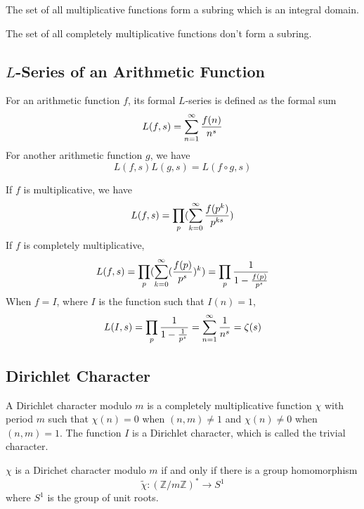 The set of all multiplicative functions form a subring which is an integral domain.

The set of all completely multiplicative functions don't form a subring.

\subsection{$L$-Series of an Arithmetic Function}
For an arithmetic function $f$, its formal $L$-series is defined as the formal sum
\begin{equation*}
  L(f, s) = \sum_{n=1}^\infty {f(n) \over n^s}
\end{equation*}
For another arithmetic function $g$, we have
\begin{equation*}
  L(f, s) L(g, s) = L(f \circ g, s)
\end{equation*}

If $f$ is multiplicative, we have
\begin{equation*}
  L(f, s) = \prod_p (\sum_{k=0}^\infty {f(p^k) \over p^{ks}})
\end{equation*}
If $f$ is completely multiplicative,
\begin{equation*}
  L(f, s)
  = \prod_p (\sum_{k=0}^\infty ({f(p) \over p^s})^k)
  = \prod_p {1 \over 1 - {f(p) \over p^s}}
\end{equation*}
When $f = I$, where $I$ is the function such that $I(n) = 1$,
\begin{equation*}
  L(I, s)
  = \prod_p {1 \over 1 - {1 \over p^s}}
  = \sum_{n=1}^\infty {1 \over n^s}
  = \zeta(s)
\end{equation*}

\subsection{Dirichlet Character}
A Dirichlet character modulo $m$ is a completely multiplicative function $\chi$
with period $m$ such that $\chi(n) = 0$ when $(n, m) \neq 1$
and $\chi(n) \neq 0$ when $(n, m) = 1$. The function $I$ is a Dirichlet character,
which is called the trivial character.

$\chi$ is a Dirichet character modulo $m$ if and only if there is a group homomorphism
$$\tilde\chi : (\mathbb Z / m \mathbb Z)^\ast \to S^1$$
where $S^1$ is the group of unit roots.
